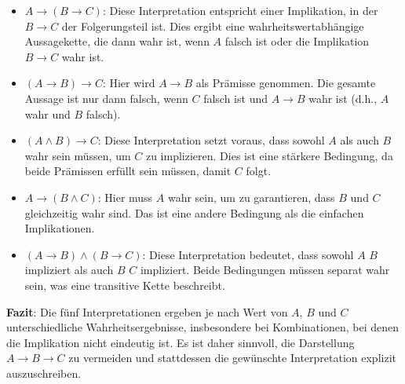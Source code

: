 \documentclass[a4paper]{scrartcl}
\begin{document}
\begin{itemize}
    \item \textbf{$A \rightarrow (B \rightarrow C)$}: Diese Interpretation entspricht einer Implikation, in der $B \rightarrow C$ der Folgerungsteil ist. Dies ergibt eine wahrheitswertabhängige Aussagekette, die dann wahr ist, wenn $A$ falsch ist oder die Implikation $B \rightarrow C$ wahr ist.
    
    \item \textbf{$(A \rightarrow B) \rightarrow C$}: Hier wird $A \rightarrow B$ als Prämisse genommen. Die gesamte Aussage ist nur dann falsch, wenn $C$ falsch ist und $A \rightarrow B$ wahr ist (d.h., $A$ wahr und $B$ falsch).
    
    \item \textbf{$(A \land B) \rightarrow C$}: Diese Interpretation setzt voraus, dass sowohl $A$ als auch $B$ wahr sein müssen, um $C$ zu implizieren. Dies ist eine stärkere Bedingung, da beide Prämissen erfüllt sein müssen, damit $C$ folgt.
    
    \item \textbf{$A \rightarrow (B \land C)$}: Hier muss $A$ wahr sein, um zu garantieren, dass $B$ und $C$ gleichzeitig wahr sind. Das ist eine andere Bedingung als die einfachen Implikationen.
    
    \item \textbf{$(A \rightarrow B) \land (B \rightarrow C)$}: Diese Interpretation bedeutet, dass sowohl $A$ $B$ impliziert als auch $B$ $C$ impliziert. Beide Bedingungen müssen separat wahr sein, was eine transitive Kette beschreibt.
\end{itemize}

\textbf{Fazit}: Die fünf Interpretationen ergeben je nach Wert von $A$, $B$ und $C$ unterschiedliche Wahrheitsergebnisse, insbesondere bei Kombinationen, bei denen die Implikation nicht eindeutig ist. Es ist daher sinnvoll, die Darstellung $A \rightarrow B \rightarrow C$ zu vermeiden und stattdessen die gewünschte Interpretation explizit auszuschreiben.
\end{document}

